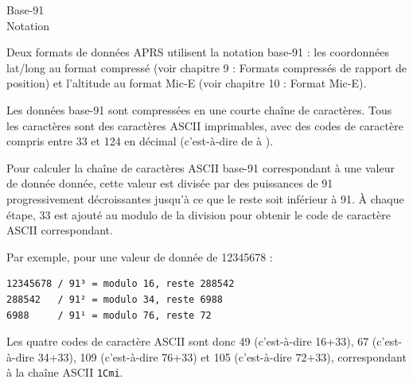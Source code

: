 \begin{aprssideblock}{Base-91\\Notation}
\label{notation-base-91}
Deux formats de données APRS utilisent la notation base-91 : les
coordonnées lat/long au format compressé (voir chapitre 9 : Formats
compressés de rapport de position) et l'altitude au format Mic-E (voir
chapitre 10 : Format Mic-E).

Les données base-91 sont compressées en une courte chaîne de caractères.
Tous les caractères sont des caractères ASCII imprimables, avec des codes de
caractère compris entre 33 et 124 en décimal (c'est-à-dire de \lit{!} à
\lit{\textbar{}}).

Pour calculer la chaîne de caractères ASCII base-91 correspondant à une
valeur de donnée donnée, cette valeur est divisée par des puissances de 91
progressivement décroissantes jusqu'à ce que le reste soit inférieur à 91. À
chaque étape, 33 est ajouté au modulo de la division pour obtenir le code de
caractère ASCII correspondant.

Par exemple, pour une valeur de donnée de 12345678 :

\begin{verbatim}
12345678 / 91³ = modulo 16, reste 288542
288542   / 91² = modulo 34, reste 6988
6988     / 91¹ = modulo 76, reste 72
\end{verbatim}

Les quatre codes de caractère ASCII sont donc 49 (c'est-à-dire 16+33), 67
(c'est-à-dire 34+33), 109 (c'est-à-dire 76+33) et 105 (c'est-à-dire 72+33),
correspondant à la chaîne ASCII \texttt{1Cmi}.
\end{aprssideblock}

